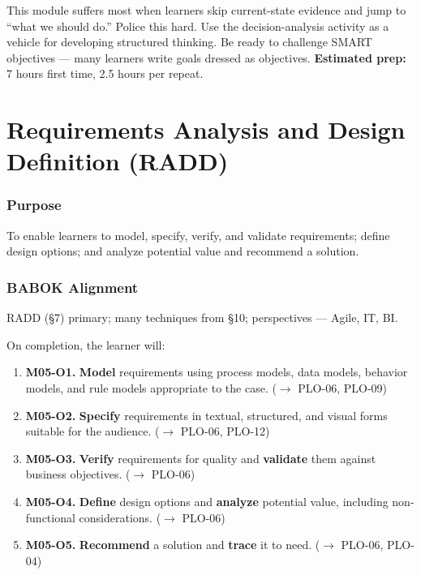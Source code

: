 \documentclass[11pt,letterpaper,oneside]{report}
\begin{document}
\begin{curriculumteachingnotes}
This module suffers most when learners skip current-state evidence and jump to ``what we should do.'' Police this hard. Use the decision-analysis activity as a vehicle for developing structured thinking. Be ready to challenge SMART objectives --- many learners write goals dressed as objectives. \textbf{Estimated prep:} 7 hours first time, 2.5 hours per repeat.
\end{curriculumteachingnotes}

\chapter{Requirements Analysis and Design Definition (RADD)}

\subsection*{Purpose}
To enable learners to model, specify, verify, and validate requirements; define design options; and analyze potential value and recommend a solution.

\subsection*{BABOK Alignment}
RADD (\S7) primary; many techniques from \S10; perspectives --- Agile, IT, BI.

\begin{outcomes}
On completion, the learner will:
\begin{enumerate}
  \item \textbf{M05-O1.} \textbf{Model} requirements using process models, data models, behavior models, and rule models appropriate to the case. ($\to$ PLO-06, PLO-09)
  \item \textbf{M05-O2.} \textbf{Specify} requirements in textual, structured, and visual forms suitable for the audience. ($\to$ PLO-06, PLO-12)
  \item \textbf{M05-O3.} \textbf{Verify} requirements for quality and \textbf{validate} them against business objectives. ($\to$ PLO-06)
  \item \textbf{M05-O4.} \textbf{Define} design options and \textbf{analyze} potential value, including non-functional considerations. ($\to$ PLO-06)
  \item \textbf{M05-O5.} \textbf{Recommend} a solution and \textbf{trace} it to need. ($\to$ PLO-06, PLO-04)
\end{enumerate}
\end{outcomes}
\end{document}
